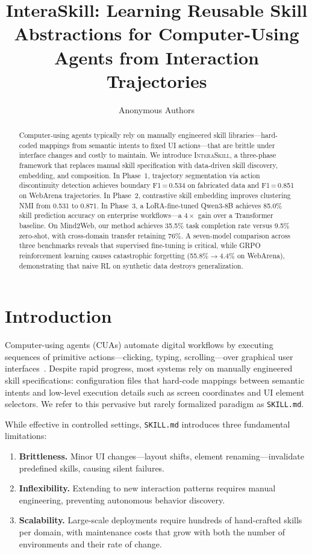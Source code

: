 \documentclass{article}
\title{InteraSkill: Learning Reusable Skill Abstractions for Computer-Using Agents from Interaction Trajectories}
\author{Anonymous Authors}
\begin{document}
\maketitle

\begin{abstract}
Computer-using agents typically rely on manually engineered skill libraries---hard-coded mappings from semantic intents to fixed UI actions---that are brittle under interface changes and costly to maintain. We introduce \textsc{InteraSkill}, a three-phase framework that replaces manual skill specification with data-driven skill discovery, embedding, and composition. In Phase~1, trajectory segmentation via action discontinuity detection achieves boundary F1\,=\,0.534 on fabricated data and F1\,=\,0.851 on WebArena trajectories. In Phase~2, contrastive skill embedding improves clustering NMI from 0.531 to 0.871. In Phase~3, a LoRA-fine-tuned Qwen3-8B achieves 85.0\% skill prediction accuracy on enterprise workflows---a $4\times$ gain over a Transformer baseline. On Mind2Web, our method achieves 35.5\% task completion rate versus 9.5\% zero-shot, with cross-domain transfer retaining 76\%. A seven-model comparison across three benchmarks reveals that supervised fine-tuning is critical, while GRPO reinforcement learning causes catastrophic forgetting (55.8\%$\to$4.4\% on WebArena), demonstrating that naive RL on synthetic data destroys generalization.
\end{abstract}

\section{Introduction}

Computer-using agents (CUAs) automate digital workflows by executing sequences of primitive actions---clicking, typing, scrolling---over graphical user interfaces~\cite{yao2022webshop,deng2023mind2web,zhou2024webarena}. Despite rapid progress, most systems rely on manually engineered skill specifications: configuration files that hard-code mappings between semantic intents and low-level execution details such as screen coordinates and UI element selectors. We refer to this pervasive but rarely formalized paradigm as \texttt{SKILL.md}.

While effective in controlled settings, \texttt{SKILL.md} introduces three fundamental limitations:
\begin{enumerate}
    \item \textbf{Brittleness.} Minor UI changes---layout shifts, element renaming---invalidate predefined skills, causing silent failures.
    \item \textbf{Inflexibility.} Extending to new interaction patterns requires manual engineering, preventing autonomous behavior discovery.
    \item \textbf{Scalability.} Large-scale deployments require hundreds of hand-crafted skills per domain, with maintenance costs that grow with both the number of environments and their rate of change.
\end{enumerate}
\end{document}
